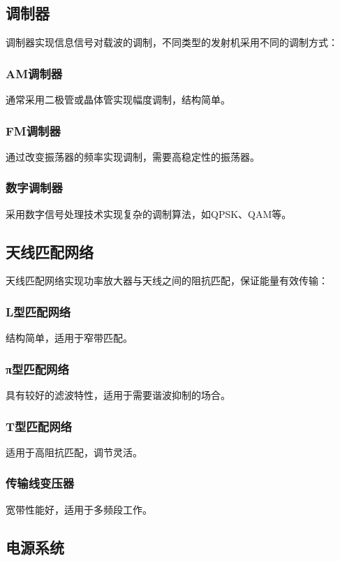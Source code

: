 \documentclass[12pt,UTF8]{ctexbook}
\begin{document}
\subsection{调制器}

调制器实现信息信号对载波的调制，不同类型的发射机采用不同的调制方式：

\subsubsection{AM调制器}
通常采用二极管或晶体管实现幅度调制，结构简单。

\subsubsection{FM调制器}
通过改变振荡器的频率实现调制，需要高稳定性的振荡器。

\subsubsection{数字调制器}
采用数字信号处理技术实现复杂的调制算法，如QPSK、QAM等。

\subsection{天线匹配网络}

天线匹配网络实现功率放大器与天线之间的阻抗匹配，保证能量有效传输：

\subsubsection{L型匹配网络}
结构简单，适用于窄带匹配。

\subsubsection{π型匹配网络}
具有较好的滤波特性，适用于需要谐波抑制的场合。

\subsubsection{T型匹配网络}
适用于高阻抗匹配，调节灵活。

\subsubsection{传输线变压器}
宽带性能好，适用于多频段工作。

\subsection{电源系统}
\end{document}
